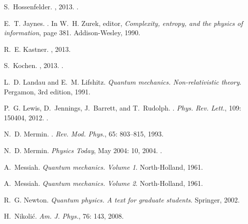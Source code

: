 \documentclass[a4paper,12pt]{article}
\begin{document}
\begin{thebibliography}{63}
S.~Hossenfelder.
, 2013.
.

E.~T. Jaynes.
.
\newblock In W.~H. Zurek, editor, \emph{Complexity, entropy, and the physics of
  information}, page 381. Addison-Wesley, 1990.

R.~E. Kastner.
, 2013.

S.~Kochen.
, 2013.
.

L.~D. Landau and E.~M. Lifshitz.
\newblock \emph{{Quantum mechanics. Non-relativistic theory}}.
\newblock Pergamon, 3rd edition, 1991.

P.~G. Lewis, D.~Jennings, J.~Barrett, and T.~Rudolph.
.
\newblock \emph{Phys. Rev. Lett.}, 109: 150404, 2012.
.

N.~D. Mermin.
.
\newblock \emph{Rev. Mod. Phys.}, 65: 803--815, 1993.

N.~D. Mermin.
\newblock \emph{Physics Today}, May 2004: 10, 2004.
.

A.~Messiah.
\newblock \emph{{Quantum mechanics. Volume 1}}.
\newblock North-Holland, 1961{}.

A.~Messiah.
\newblock \emph{{Quantum mechanics. Volume 2}}.
\newblock North-Holland, 1961{}.

R.~G. Newton.
\newblock \emph{{Quantum physics. A text for graduate students}}.
\newblock Springer, 2002.

H.~Nikoli\'c.
\newblock \emph{Am. J. Phys.}, 76: 143, 2008.


\end{thebibliography}
\end{document}
